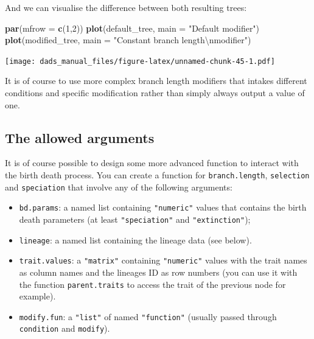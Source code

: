 \documentclass[]{book}
\newenvironment{Shaded}{\begin{snugshade}}{\end{snugshade}}
\newcommand{\CharTok}[1]{\textcolor[rgb]{0.31,0.60,0.02}{#1}}
\newcommand{\DataTypeTok}[1]{\textcolor[rgb]{0.13,0.29,0.53}{#1}}
\newcommand{\DecValTok}[1]{\textcolor[rgb]{0.00,0.00,0.81}{#1}}
\newcommand{\KeywordTok}[1]{\textcolor[rgb]{0.13,0.29,0.53}{\textbf{#1}}}
\newcommand{\NormalTok}[1]{#1}
\newcommand{\StringTok}[1]{\textcolor[rgb]{0.31,0.60,0.02}{#1}}
\providecommand{\tightlist}{%
  \setlength{\itemsep}{0pt}\setlength{\parskip}{0pt}}
\begin{document}
And we can visualise the difference between both resulting trees:

\begin{Shaded}
\begin{Highlighting}[]
\KeywordTok{par}\NormalTok{(}\DataTypeTok{mfrow =} \KeywordTok{c}\NormalTok{(}\DecValTok{1}\NormalTok{,}\DecValTok{2}\NormalTok{))}
\KeywordTok{plot}\NormalTok{(default_tree,  }\DataTypeTok{main =} \StringTok{"Default modifier"}\NormalTok{)}
\KeywordTok{plot}\NormalTok{(modified_tree, }\DataTypeTok{main =} \StringTok{"Constant branch length}\CharTok{\textbackslash{}n}\StringTok{modifier"}\NormalTok{)}
\end{Highlighting}
\end{Shaded}

\texttt{[image: dads\_manual\_files/figure-latex/unnamed-chunk-45-1.pdf]}

It is of course to use more complex branch length modifiers that intakes different conditions and specific modification rather than simply always output a value of one.

\hypertarget{allowarguments}{%
\subsection{The allowed arguments}\label{allowarguments}}

It is of course possible to design some more advanced function to interact with the birth death process.
You can create a function for \texttt{branch.length}, \texttt{selection} and \texttt{speciation} that involve any of the following arguments:

\begin{itemize}
\tightlist
\item
  \texttt{bd.params}: a named list containing \texttt{"numeric"} values that contains the birth death parameters (at least \texttt{"speciation"} and \texttt{"extinction"});
\item
  \texttt{lineage}: a named list containing the lineage data (see below).
\item
  \texttt{trait.values}: a \texttt{"matrix"} containing \texttt{"numeric"} values with the trait names as column names and the lineages ID as row numbers (you can use it with the function \texttt{parent.traits} to access the trait of the previous node for example).
\item
  \texttt{modify.fun}: a \texttt{"list"} of named \texttt{"function"} (usually passed through \texttt{condition} and \texttt{modify}).
\end{itemize}
\end{document}
